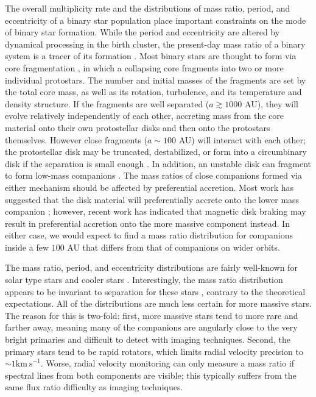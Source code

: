 \documentclass{emulateapj}
\begin{document}
The overall multiplicity rate and the distributions of mass ratio, period, and eccentricity of a binary star population place important constraints on the mode of binary star formation. While the period and eccentricity are altered by dynamical processing in the birth cluster, the present-day mass ratio of a binary system is a tracer of its formation \citep{Parker2013}. Most binary stars are thought to form via core fragmentation \citep{Boss1979, Boss1986, Bate1995}, in which a collapsing core fragments into two or more individual protostars. The number and initial masses of the fragments are set by the total core mass, as well as its rotation, turbulence, and its temperature and density structure. If the fragments are well separated ($a \gtrsim 1000$ AU), they will evolve relatively independently of each other, accreting mass from the core material onto their own protostellar disks and then onto the protostars themselves. However close fragments ($a \sim 100$ AU) will interact with each other; the protostellar disk may be truncated, destabilized, or form into a circumbinary disk if the separation is small enough \citep{Bate1997}. In addition, an unstable disk can fragment to form low-mass companions \citep{Kratter2006, Stamatellos2011}. The mass ratios of close companions formed via either mechanism should be affected by preferential accretion. Most work has suggested that the disk material will preferentially accrete onto the lower mass companion \citep{Bate1997, BBB2002}; however, recent work has indicated that magnetic disk braking may result in preferential accretion onto the more massive component \citep{Zhao2013} instead. In either case, we would expect to find a mass ratio distribution for companions inside a few $100$ AU that differs from that of companions on wider orbits.

The mass ratio, period, and eccentricity distributions are fairly well-known for solar type stars \citep{Duquennoy1991, Raghavan2010} and cooler stars \citep{Fischer1992, Delfosse2004}. Interestingly, the mass ratio distribution appears to be invariant to separation for these stars \citep{Meyer2013}, contrary to the theoretical expectations. All of the distributions are much less certain for more massive stars. The reason for this is two-fold: first, more massive stars tend to more rare and farther away, meaning many of the companions are angularly close to the very bright primaries and difficult to detect with imaging techniques. Second, the primary stars tend to be rapid rotators, which limits radial velocity precision to $\sim 1 \mathrm{km\ s}^{-1}$. Worse, radial velocity monitoring can only measure a mass ratio if spectral lines from both components are visible; this typically suffers from the same flux ratio difficulty as imaging techniques. 
\end{document}
